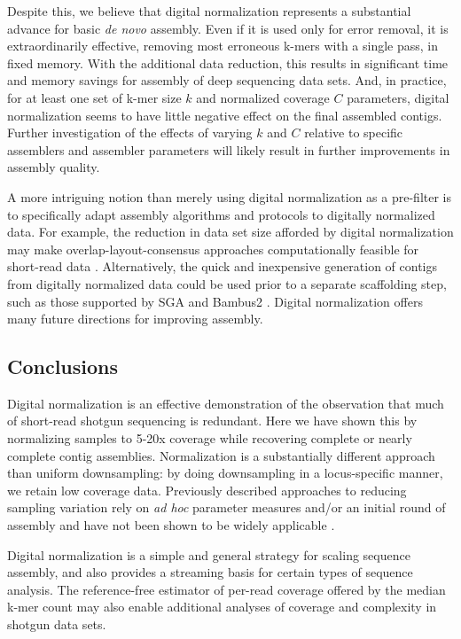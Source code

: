 \documentclass{pnastwo}
\begin{document}
\begin{article}
Despite this,
we believe that
digital normalization represents a substantial advance for basic {\em
  de novo} assembly.  Even if it is used only for error
removal, it is extraordinarily effective, removing most erroneous
k-mers with a single pass, in fixed memory.  With the additional data
reduction, this results in significant time and memory savings for
assembly of deep sequencing data sets.  And, in practice, for at least
one set of k-mer size $k$ and normalized coverage $C$ parameters, digital
normalization seems to have little negative effect on the final
assembled contigs.  Further investigation of the effects of varying
$k$ and $C$ relative to specific assemblers and assembler parameters
will likely result in further improvements in assembly quality.

A more intriguing notion than merely using digital normalization as a
pre-filter is to specifically adapt assembly algorithms and protocols
to digitally normalized data.  For example, the reduction in data set
size afforded by digital normalization may make
overlap-layout-consensus approaches computationally feasible for
short-read data \cite{pubmed20211242}.  Alternatively, the quick and
inexpensive generation of contigs from digitally normalized data could
be used prior to a separate scaffolding step, such as those supported
by SGA and Bambus2 \cite{pubmed20529929,pubmed21926123}.  Digital
normalization offers many future directions for improving assembly.

\subsection{Conclusions}

Digital normalization is an effective demonstration of the observation
that much of short-read shotgun sequencing is redundant.  Here we have
shown this by normalizing samples to 5-20x coverage while recovering
complete or nearly complete contig assemblies.  Normalization is a
substantially different approach than uniform downsampling: by doing
downsampling in a locus-specific manner, we retain low coverage data.
Previously described approaches to reducing sampling variation rely on
{\em ad hoc} parameter measures and/or an initial round of assembly
and have not been shown to be widely applicable
\cite{pubmed19724646,pubmed22028825}.

Digital normalization is a simple and general strategy for scaling
sequence assembly, and also provides a streaming basis for certain
types of sequence analysis.  The reference-free estimator of per-read
coverage offered by the median k-mer count may also enable additional
analyses of coverage and complexity in shotgun data sets.


\end{article}
\end{document}
